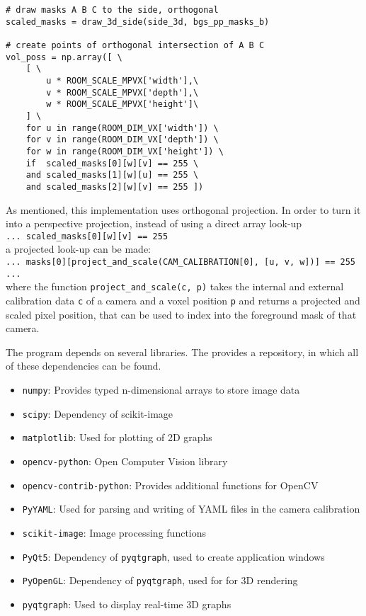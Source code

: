 \begin{lstlisting}[caption={Orthogonal volume intersection implementation}, label={lst:impl:volintersect}]
# draw masks A B C to the side, orthogonal
scaled_masks = draw_3d_side(side_3d, bgs_pp_masks_b)

# create points of orthogonal intersection of A B C
vol_poss = np.array([ \
    [ \
        u * ROOM_SCALE_MPVX['width'],\
        v * ROOM_SCALE_MPVX['depth'],\
        w * ROOM_SCALE_MPVX['height']\
    ] \
    for u in range(ROOM_DIM_VX['width']) \
    for v in range(ROOM_DIM_VX['depth']) \
    for w in range(ROOM_DIM_VX['height']) \
    if  scaled_masks[0][w][v] == 255 \
    and scaled_masks[1][w][u] == 255 \
    and scaled_masks[2][w][v] == 255 ])
\end{lstlisting}

As mentioned, this implementation uses orthogonal projection.
In order to turn it into a perspective projection, instead of using a direct array look-up \\
\texttt{... scaled\_masks[0][w][v] == 255} \\
a projected look-up can be made:\\
\texttt{... masks[0][project\_and\_scale(CAM\_CALIBRATION[0], [u, v, w])] == 255 ...} \\
where the function \texttt{project\_and\_scale(c, p)} takes the internal and external calibration data \texttt{c} of a camera and a voxel position \texttt{p} and returns a projected and scaled pixel position, that can be used to index into the foreground mask of that camera.



The program depends on several libraries.
The \textcite{python2018pypi} provides a repository, in which all of these dependencies can be found.
\begin{itemize}[noitemsep]
    \item \texttt{numpy}:  Provides typed n-dimensional arrays to store image data
    \item \texttt{scipy}:  Dependency of scikit-image
    \item \texttt{matplotlib}: Used for plotting of 2D graphs
    \item \texttt{opencv-python}: Open Computer Vision library
    \item \texttt{opencv-contrib-python}: Provides additional functions for OpenCV
    \item \texttt{PyYAML}: Used for parsing and writing of \ac{YAML} files in the camera calibration
    \item \texttt{scikit-image}: Image processing functions  
    \item \texttt{PyQt5}: Dependency of \texttt{pyqtgraph}, used to create application windows
    \item \texttt{PyOpenGL}: Dependency of \texttt{pyqtgraph}, used for for \ac{3D} rendering 
    \item \texttt{pyqtgraph}: Used to display real-time 3D graphs
\end{itemize}

